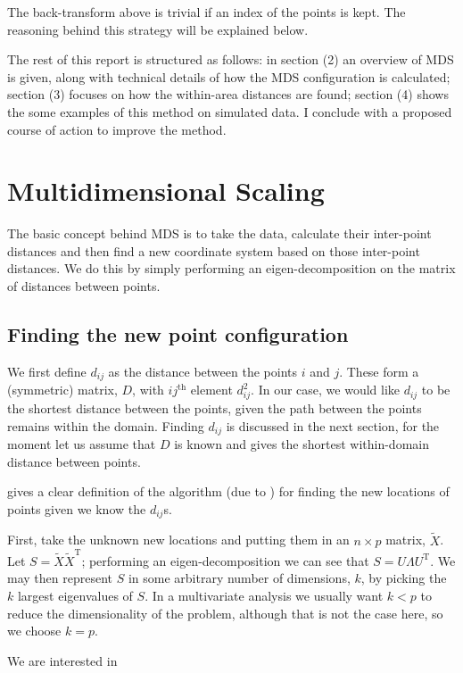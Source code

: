 \documentclass[a4paper,10pt]{article}
\newcommand{\tr}[1]{#1^{\text{T}}}
\begin{document}
The back-transform above is trivial if an index of the points is kept. The reasoning behind this strategy will be explained below.

The rest of this report is structured as follows: in section (2) an overview of MDS is given, along with technical details of how the MDS configuration is calculated; section (3) focuses on how the within-area distances are found; section (4) shows the some examples of this method on simulated data. I conclude with a proposed course of action to improve the method.

\section{Multidimensional Scaling}

The basic concept behind MDS is to take the data, calculate their inter-point distances and then find a new coordinate system based on those inter-point distances. We do this by simply performing an eigen-decomposition on the matrix of distances between points.

\subsection{Finding the new point configuration}

We first define $d_{ij}$ as the distance between the points $i$ and $j$. These form a (symmetric) matrix, $D$, with $ij^{\text{th}}$ element $d^2_{ij}$. In our case, we would like $d_{ij}$ to be the shortest distance between the points, given the path between the points remains within the domain. Finding $d_{ij}$ is discussed in the next section, for the moment let us assume that $D$ is known and gives the shortest within-domain distance between points.

\cite{diaconis08} gives a clear definition of the algorithm (due to \cite{schoenberg35}) for finding the new locations of points given we know the $d_{ij}$s. 

First, take the unknown new locations and putting them in an $n \times p$ matrix, $\tilde{X}$. Let $S=\tilde{X}\tr{\tilde{X}}$; performing an eigen-decomposition we can see that $S=U\Lambda\tr{U}$. We may then represent $S$ in some arbitrary number of dimensions, $k$, by picking the $k$ largest eigenvalues of $S$. In a multivariate analysis we usually want $k<p$ to reduce the dimensionality of the problem, although that is not the case here, so we choose $k=p$.

We are interested in
\end{document}
